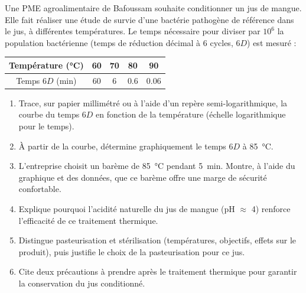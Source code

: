 \documentclass[11pt]{article}
\begin{document}
\begin{exercice}
Une PME agroalimentaire de Bafoussam souhaite conditionner un jus de mangue. Elle fait réaliser une étude de survie d'une bactérie pathogène de référence dans le jus, à différentes températures. Le temps nécessaire pour diviser par $10^{6}$ la population bactérienne (temps de réduction décimal à 6 cycles, $6D$) est mesuré :

\begin{center}
\begin{tabular}{|c|c|c|c|c|}
\hline
\rowcolor{popblueL} Température (\si{\celsius}) & 60 & 70 & 80 & 90 \\
\hline
Temps $6D$ (min) & 60 & 6 & \num{0,6} & \num{0,06} \\
\hline
\end{tabular}
\end{center}

\begin{enumerate}
\item Trace, sur papier millimétré ou à l'aide d'un repère semi-logarithmique, la courbe du temps $6D$ en fonction de la température (échelle logarithmique pour le temps).
\item À partir de la courbe, détermine graphiquement le temps $6D$ à \SI{85}{\celsius}.
\item L'entreprise choisit un barème de \SI{85}{\celsius} pendant \SI{5}{min}. Montre, à l'aide du graphique et des données, que ce barème offre une marge de sécurité confortable.
\item Explique pourquoi l'acidité naturelle du jus de mangue (pH $\approx$ 4) renforce l'efficacité de ce traitement thermique.
\item Distingue pasteurisation et stérilisation (températures, objectifs, effets sur le produit), puis justifie le choix de la pasteurisation pour ce jus.
\item Cite deux précautions à prendre après le traitement thermique pour garantir la conservation du jus conditionné.
\end{enumerate}
\end{exercice}
\end{document}
